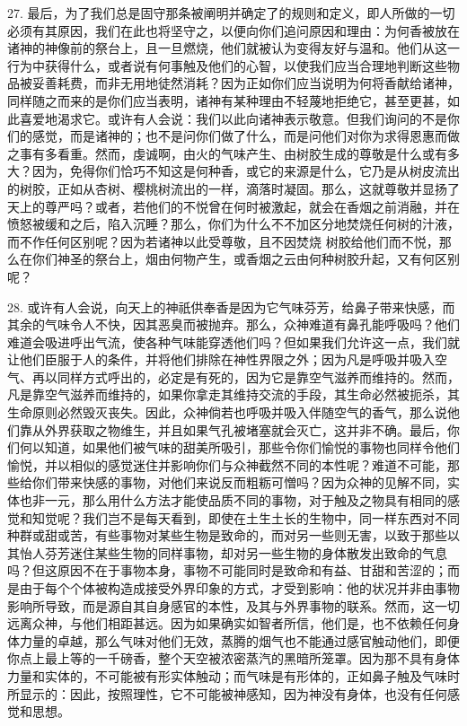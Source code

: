 27. 最后，为了我们总是固守那条被阐明并确定了的规则和定义，即人所做的一切必须有其原因，我们在此也将坚守之，以便向你们追问原因和理由：为何香被放在诸神的神像前的祭台上，且一旦燃烧，他们就被认为变得友好与温和。他们从这一行为中获得什么，或者说有何事触及他们的心智，以使我们应当合理地判断这些物品被妥善耗费，而非无用地徒然消耗？因为正如你们应当说明为何将香献给诸神，同样随之而来的是你们应当表明，诸神有某种理由不轻蔑地拒绝它，甚至更甚，如此喜爱地渴求它。或许有人会说：我们以此向诸神表示敬意。但我们询问的不是你们的感觉，而是诸神的；也不是问你们做了什么，而是问他们对你为求得恩惠而做之事有多看重。然而，虔诚啊，由火的气味产生、由树胶生成的尊敬是什么或有多大？因为，免得你们恰巧不知这是何种香，或它的来源是什么，它乃是从树皮流出的树胶，正如从杏树、樱桃树流出的一样，滴落时凝固。那么，这就尊敬并显扬了天上的尊严吗？或者，若他们的不悦曾在何时被激起，就会在香烟之前消融，并在愤怒被缓和之后，陷入沉睡？那么，你们为什么不不加区分地焚烧任何树的汁液，而不作任何区别呢？因为若诸神以此受尊敬，且不因焚烧  树胶给他们而不悦，那么在你们神圣的祭台上，烟由何物产生，或香烟之云由何种树胶升起，又有何区别呢？\par

28. 或许有人会说，向天上的神祇供奉香是因为它气味芬芳，给鼻子带来快感，而其余的气味令人不快，因其恶臭而被抛弃。那么，众神难道有鼻孔能呼吸吗？他们难道会吸进呼出气流，使各种气味能穿透他们吗？但如果我们允许这一点，我们就让他们臣服于人的条件，并将他们排除在神性界限之外；因为凡是呼吸并吸入空气、再以同样方式呼出的，必定是有死的，因为它是靠空气滋养而维持的。然而，凡是靠空气滋养而维持的，如果你拿走其维持交流的手段，其生命必然被扼杀，其生命原则必然毁灭丧失。因此，众神倘若也呼吸并吸入伴随空气的香气，那么说他们靠从外界获取之物维生，并且如果气孔被堵塞就会灭亡，这并非不确。最后，你们何以知道，如果他们被气味的甜美所吸引，那些令你们愉悦的事物也同样令他们愉悦，并以相似的感觉迷住并影响你们与众神截然不同的本性呢？难道不可能，那些给你们带来快感的事物，对他们来说反而粗粝可憎吗？因为众神的见解不同，实体也非一元，那么用什么方法才能使品质不同的事物，对于触及之物具有相同的感觉和知觉呢？我们岂不是每天看到，即使在土生土长的生物中，同一样东西对不同种群或甜或苦，有些事物对某些生物是致命的，而对另一些则无害，以致于那些以其怡人芬芳迷住某些生物的同样事物，却对另一些生物的身体散发出致命的气息吗？但这原因不在于事物本身，事物不可能同时是致命和有益、甘甜和苦涩的；而是由于每个个体被构造成接受外界印象的方式，才受到影响：他的状况并非由事物影响所导致，而是源自其自身感官的本性，及其与外界事物的联系。然而，这一切远离众神，与他们相距甚远。因为如果确实如智者所信，他们是，也不依赖任何身体力量的卓越，那么气味对他们无效，蒸腾的烟气也不能通过感官触动他们，即便你点上最上等的一千磅香，整个天空被浓密蒸汽的黑暗所笼罩。因为那不具有身体力量和实体的，不可能被有形实体触动；而气味是有形体的，正如鼻子触及气味时所显示的：因此，按照理性，它不可能被神感知，因为神没有身体，也没有任何感觉和思想。\par


